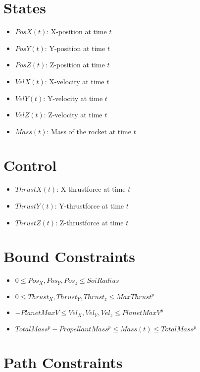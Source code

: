 \documentclass[11pt]{report}
\begin{document}
\section{States}

\begin{itemize}
\item $PosX(t)$: X-position at time $t$
\item $PosY(t)$: Y-position at time $t$
\item $PosZ(t)$: Z-position at time $t$

\item $VelX(t)$: X-velocity at time $t$
\item $VelY(t)$: Y-velocity at time $t$
\item $VelZ(t)$: Z-velocity at time $t$

\item $Mass(t)$: Mass of the rocket at time $t$
\end{itemize}

\section{Control}

\begin{itemize}
\item $ThrustX(t)$: X-thrustforce at time $t$
\item $ThrustY(t)$: Y-thrustforce at time $t$
\item $ThrustZ(t)$: Z-thrustforce at time $t$
\end{itemize}

\section{Bound Constraints}

\begin{itemize}
\item $0\leq Pos_X, Pos_Y, Pos_z \leq SoiRadius$
\item $0\leq Thrust_X, Thrust_Y, Thrust_z \leq MaxThrust^p$
\item $-PlanetMaxV\leq Vel_X, Vel_Y, Vel_z \leq PlanetMaxV^p$
\item $TotalMass^p - PropellantMass^p \leq Mass(t) \leq TotalMass^p$
\end{itemize}

\section{Path Constraints}
\end{document}
